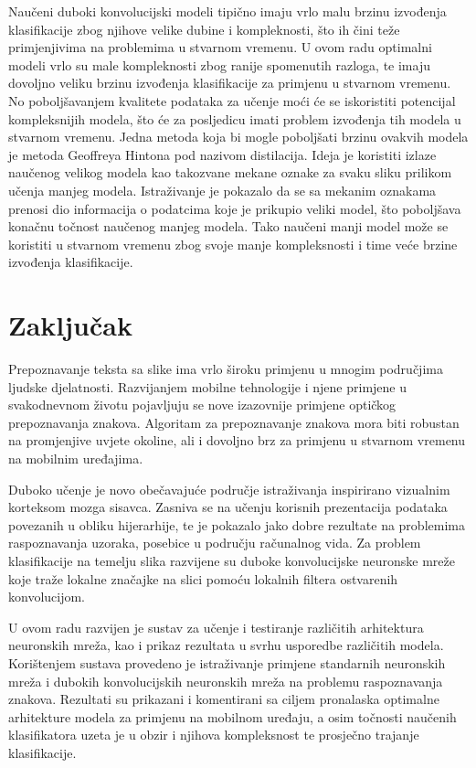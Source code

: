 \documentclass[lmodern, utf8, diplomski, numeric]{fer}
\begin{document}
Naučeni duboki konvolucijski modeli tipično imaju vrlo malu brzinu izvođenja klasifikacije zbog njihove velike dubine i kompleknosti, što ih čini teže primjenjivima na problemima u stvarnom vremenu. U ovom radu optimalni modeli vrlo su male kompleknosti zbog ranije spomenutih razloga, te imaju dovoljno veliku brzinu izvođenja klasifikacije za primjenu u stvarnom vremenu. No poboljšavanjem kvalitete podataka za učenje moći će se iskoristiti potencijal kompleksnijih modela, što će za posljedicu imati problem izvođenja tih modela u stvarnom vremenu. Jedna metoda koja bi mogle poboljšati brzinu ovakvih modela je metoda Geoffreya Hintona pod nazivom distilacija. Ideja je koristiti izlaze naučenog velikog modela kao takozvane mekane oznake za svaku sliku prilikom učenja manjeg modela. Istraživanje je pokazalo da se sa mekanim oznakama prenosi dio informacija o podatcima koje je prikupio veliki model, što poboljšava konačnu točnost naučenog manjeg modela. Tako naučeni manji model može se koristiti u stvarnom vremenu zbog svoje manje kompleksnosti i time veće brzine izvođenja klasifikacije.   



\chapter{Zaključak}

Prepoznavanje teksta sa slike ima vrlo široku primjenu u mnogim područjima ljudske djelatnosti. Razvijanjem mobilne tehnologije i njene primjene u svakodnevnom životu pojavljuju se nove izazovnije primjene optičkog prepoznavanja znakova. Algoritam za prepoznavanje znakova mora biti robustan na promjenjive uvjete okoline, ali i dovoljno brz za primjenu u stvarnom vremenu na mobilnim uređajima. 

Duboko učenje je novo obečavajuće područje istraživanja inspirirano vizualnim korteksom mozga sisavca. Zasniva se na učenju korisnih prezentacija podataka povezanih u obliku hijerarhije, te je pokazalo jako dobre rezultate na problemima raspoznavanja uzoraka, posebice u području računalnog vida. Za problem klasifikacije na temelju slika razvijene su duboke konvolucijske neuronske mreže koje traže lokalne značajke na slici pomoću lokalnih filtera ostvarenih konvolucijom. 

U ovom radu razvijen je sustav za učenje i testiranje različitih arhitektura neuronskih mreža, kao i prikaz rezultata u svrhu usporedbe različitih modela. Korištenjem sustava provedeno je istraživanje primjene standarnih neuronskih mreža i dubokih konvolucijskih neuronskih mreža na problemu raspoznavanja znakova. Rezultati su prikazani i komentirani sa ciljem pronalaska optimalne arhitekture modela za primjenu na mobilnom uređaju, a osim točnosti naučenih klasifikatora uzeta je u obzir i njihova kompleksnost te prosječno trajanje klasifikacije.
\end{document}
